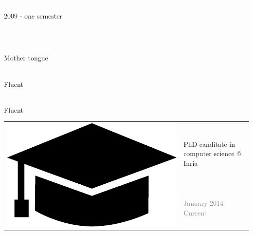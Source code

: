 \documentclass[letterpaper]{article}
\begin{document}
\begin{minipage}{1.\linewidth}
{\begin{minipage}{0.47\linewidth}
\begin{minipage}{1\linewidth}
\begin{minipage}{0.9\linewidth}
			{\normalsize \textcolor{white}{Mathematics @ 
			UAO}}\\					
			{\small\textcolor{gray!40}{2009 - one semester}}\\
		\end{minipage} 
	\end{minipage} %
	\begin{minipage}{1\linewidth} %
		\\
		\vspace{2ex}
		\begin{minipage}{0.3\linewidth}
			{\normalsize \textcolor{white}{Spanish}}\\
			{\small\textcolor{gray!40}{Mother tongue}}\\
		\end{minipage} 
		\hfill
		\begin{minipage}{0.3\linewidth}
			{\normalsize \textcolor{white}{English}}\\					
			{\small\textcolor{gray!40}{Fluent}}\\
		\end{minipage} 
		\hfill
		\begin{minipage}{0.3\linewidth}
			{\normalsize \textcolor{white}{French}}\\					
			{\small\textcolor{gray!40}{Fluent}}\\
		\end{minipage} 
	\end{minipage} %
\end{minipage} %
}%
% 
%
%
\hfill
\begin{minipage}{0.47\linewidth}
	\begin{minipage}{1\linewidth}
	\end{minipage}
	\begin{minipage}{1\linewidth} %
		\vspace{2ex}
		\begin{tabularx}{1\textwidth}{rX}				
			\multirow{2}{*}{\includegraphics[trim= 0.1cm 0.1cm 0.1cm 0.1cm,	
			clip=true, width=0.12\linewidth]{hat.eps}} & {\large PhD canditate 
			in computer science @ Inria}\\
			& {\small\textcolor{gray}{January 2014 - Current}}\\
		\end{tabularx}
		\vspace{0.1cm}
		

\end{minipage}
\end{minipage}
\end{minipage}
\end{document}
